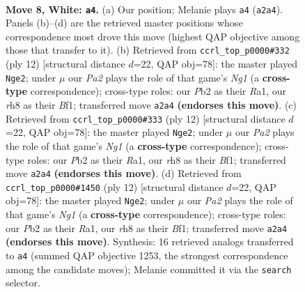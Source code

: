 \documentclass[11pt]{article}
\begin{document}
\begin{figure}[p]\centering
\begin{subfigure}{0.46\textwidth}\centering
\resizebox{\linewidth}{!}{%
\newchessgame
\chessboard[
  setfen={rnbqkb1r/pp3p2/3p1np1/2pP3p/4P3/2N1B3/PP3PPP/R2QKBNR w KQkq - 0 8},
  showmover=false,
  pgfstyle=straightmove, color=movearrow, markmove={a2-a4}
]}
\caption{}
\end{subfigure}\hfill
\begin{subfigure}{0.46\textwidth}\centering
\resizebox{\linewidth}{!}{%
\newchessgame
\chessboard[
  setfen={rnbqkb1r/pp3p1p/3p1np1/2pP4/4P3/2N5/PP3PPP/R1BQKBNR w KQkq - 0 7},
  showmover=false,
  pgfstyle=straightmove, color=movearrow, markmove={g1-e2}
]}
\caption{}
\end{subfigure}
\\[4pt]
\begin{subfigure}{0.46\textwidth}\centering
\resizebox{\linewidth}{!}{%
\newchessgame
\chessboard[
  setfen={rnbqkb1r/pp3p1p/3p1np1/2pP4/4P3/2N5/PP3PPP/R1BQKBNR w KQkq - 0 7},
  showmover=false,
  pgfstyle=straightmove, color=movearrow, markmove={g1-e2}
]}
\caption{}
\end{subfigure}\hfill
\begin{subfigure}{0.46\textwidth}\centering
\resizebox{\linewidth}{!}{%
\newchessgame
\chessboard[
  setfen={rnbqkb1r/pp3p1p/3p1np1/2pP4/4P3/2N5/PP3PPP/R1BQKBNR w KQkq - 0 7},
  showmover=false,
  pgfstyle=straightmove, color=movearrow, markmove={g1-e2}
]}
\caption{}
\end{subfigure}
\caption{\textbf{Move 8, White: \texttt{a4}.} (a) Our position; Melanie plays \texttt{a4} (\texttt{a2a4}). Panels (b)--(d) are the retrieved master positions whose correspondence most drove this move (highest QAP objective among those that transfer to it). (b) Retrieved from \texttt{ccrl\_top\_p0000\#332} (ply 12) [structural distance $d$=22, QAP obj=78]: the master played \texttt{Nge2}; under $\mu$ our \emph{Pa2} plays the role of that game's \emph{Ng1} (a \textbf{cross-type} correspondence); cross-type roles: our \emph{P}b2 as their \emph{R}a1, our \emph{r}h8 as their \emph{B}f1; transferred move \texttt{a2a4} \textbf{(endorses this move)}. (c) Retrieved from \texttt{ccrl\_top\_p0000\#333} (ply 12) [structural distance $d$=22, QAP obj=78]: the master played \texttt{Nge2}; under $\mu$ our \emph{Pa2} plays the role of that game's \emph{Ng1} (a \textbf{cross-type} correspondence); cross-type roles: our \emph{P}b2 as their \emph{R}a1, our \emph{r}h8 as their \emph{B}f1; transferred move \texttt{a2a4} \textbf{(endorses this move)}. (d) Retrieved from \texttt{ccrl\_top\_p0000\#1450} (ply 12) [structural distance $d$=22, QAP obj=78]: the master played \texttt{Nge2}; under $\mu$ our \emph{Pa2} plays the role of that game's \emph{Ng1} (a \textbf{cross-type} correspondence); cross-type roles: our \emph{P}b2 as their \emph{R}a1, our \emph{r}h8 as their \emph{B}f1; transferred move \texttt{a2a4} \textbf{(endorses this move)}. Synthesis: 16 retrieved analogs transferred to \texttt{a4} (summed QAP objective 1253, the strongest correspondence among the candidate moves); Melanie committed it via the \texttt{search} selector.}
\label{fig:thought-m14}
\end{figure}
\end{document}
